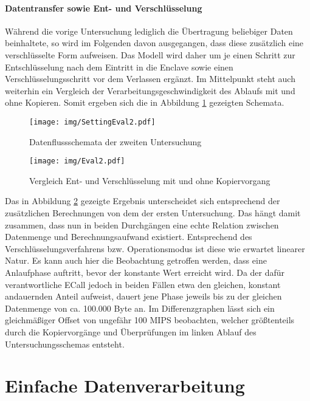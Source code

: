 \paragraph{Datentransfer sowie Ent- und Verschlüsselung}

Während die vorige Untersuchung lediglich die Übertragung beliebiger Daten beinhaltete, so wird im Folgenden davon ausgegangen, dass diese zusätzlich eine verschlüsselte Form aufweisen. Das Modell wird daher um je einen Schritt zur Entschlüsselung nach dem Eintritt in die Enclave sowie einen Verschlüsselungsschritt vor dem Verlassen ergänzt. Im Mittelpunkt steht auch weiterhin ein Vergleich der Verarbeitungsgeschwindigkeit des Ablaufs mit und ohne Kopieren. Somit ergeben sich die in Abbildung \ref{fig:settingeval2} gezeigten Schemata.

\begin{figure}[H]
	\texttt{[image: img/SettingEval2.pdf]}
	\centering
	\caption{Datenflussschemata der zweiten Untersuchung}
	\label{fig:settingeval2}
\end{figure}

\begin{figure}[H]
	\texttt{[image: img/Eval2.pdf]}
	\centering
	\caption{Vergleich Ent- und Verschlüsselung mit und ohne Kopiervorgang}
	\label{fig:eval2}
\end{figure}

Das in Abbildung \ref{fig:eval2} gezeigte Ergebnis unterscheidet sich entsprechend der zusätzlichen Berechnungen von dem der ersten Untersuchung. Das hängt damit zusammen, dass nun in beiden Durchgängen eine echte Relation zwischen Datenmenge und Berechnungsaufwand existiert. Entsprechend des Verschlüsselungsverfahrens bzw. Operationsmodus ist diese wie erwartet linearer Natur. Es kann auch hier die Beobachtung getroffen werden, dass eine Anlaufphase auftritt, bevor der konstante Wert erreicht wird. Da der dafür verantwortliche \ac{ECall} jedoch in beiden Fällen etwa den gleichen, konstant andauernden Anteil aufweist, dauert jene Phase jeweils bis zu der gleichen Datenmenge von ca. 100.000 Byte an. Im Differenzgraphen lässt sich ein gleichmäßiger Offset von ungefähr 100 \ac{MIPS} beobachten, welcher größtenteils durch die Kopiervorgänge und Überprüfungen im linken Ablauf des Untersuchungsschemas entsteht.

\section{Einfache Datenverarbeitung}

